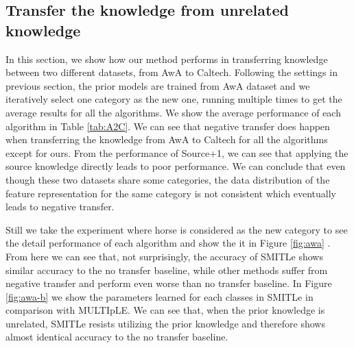 \subsection{Transfer the knowledge from unrelated knowledge}
In this section, we show how our method performs in transferring knowledge between two different datasets, from AwA to Caltech. Following the settings in previous section, the prior models are trained from AwA dataset and we iteratively select one category as the new one, running multiple times to get the average results for all the algorithms. We show the average performance of each algorithm in Table \ref{tab:A2C}. We can see that negative transfer does happen when transferring the knowledge from AwA to Caltech for all the algorithms except for ours. From the performance of Source+1, we can see that applying the source knowledge directly leads to poor performance. We can conclude that even though these two datasets share some categories, the data distribution of the feature representation for the same category is not consistent which eventually leads to negative transfer. 

Still we take the experiment where horse is considered as the new category to see the detail performance of each algorithm and show the it in Figure \ref{fig:awa} . From here we can see that, not surprisingly, the accuracy of SMITLe shows similar accuracy to the no transfer baseline, while other methods suffer from negative transfer and perform even worse than no transfer baseline. In Figure \ref{fig:awa-b} we show the parameters learned for each classes in SMITLe in comparison with MULTIpLE. We can see that, when the prior knowledge is unrelated, SMITLe resists utilizing the prior knowledge and therefore shows almost identical accuracy to the no transfer baseline.

